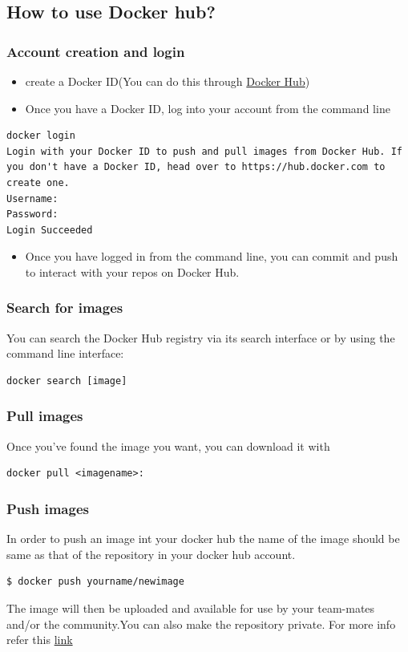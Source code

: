\documentclass[11pt]{article}
\begin{document}
\subsection{How to use Docker hub?}
\label{sec:orgheadline43}
\subsubsection{Account creation and login}
\label{sec:orgheadline39}
\begin{itemize}
\item create a Docker ID(You can do this through  \href{https://hub.docker.com/}{Docker Hub})
\item Once you have a Docker ID, log into your account from the command line
\end{itemize}
\begin{verbatim}
docker login
Login with your Docker ID to push and pull images from Docker Hub. If you don't have a Docker ID, head over to https://hub.docker.com to create one.
Username: 
Password: 
Login Succeeded
\end{verbatim}
\begin{itemize}
\item Once you have logged in from the command line, you can commit and push to
interact with your repos on Docker Hub.
\end{itemize}
\subsubsection{Search for images}
\label{sec:orgheadline40}
You can search the Docker Hub registry via its search interface or by using the
command line interface:
\begin{verbatim}
docker search [image]
\end{verbatim}
\subsubsection{Pull images}
\label{sec:orgheadline41}
Once you've found the image you want, you can download it with
\begin{verbatim}
docker pull <imagename>:
\end{verbatim}
\subsubsection{Push images}
\label{sec:orgheadline42}
In order to push an image int your docker hub the name of the image
should be same as that of the repository in your docker hub account. 
\begin{verbatim}
$ docker push yourname/newimage
\end{verbatim}
The image will then be uploaded and available for use by your team-mates and/or
the community.You can also make the repository private.
For more info refer this \href{https://docs.docker.com/engine/userguide/containers/dockerrepos/}{link}
\end{document}
